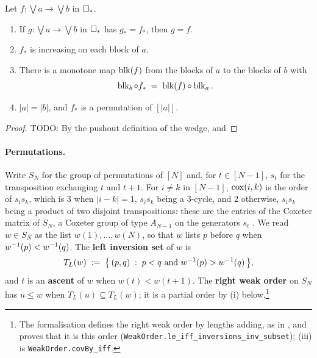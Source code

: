\documentclass[11pt]{article}
\begin{document}
\begin{proposition}\label{prop:coords}
  Let $f : \bigvee a \to \bigvee b$ in $\square_{*}$.
  \begin{enumerate}[label=(\roman*)]
    \item If $g : \bigvee a \to \bigvee b$ in $\square_{*}$ has $g_* = f_*$, then $g = f$.
    \item $f_*$ is increasing on each block of $a$.
    \item There is a monotone map $\operatorname{blk}(f)$ from the blocks of $a$ to the blocks of $b$ with
      \begin{equation}\label{eq:blk-coord}
        \operatorname{blk}_b \circ f_* \;=\; \operatorname{blk}(f) \circ \operatorname{blk}_a .
      \end{equation}
    \item $|a| = |b|$, and $f_*$ is a permutation of $[|a|]$.
  \end{enumerate}
\end{proposition}
\begin{proof}
  TODO: By the pushout definition of the wedge, and 
\end{proof}

\paragraph{Permutations.}
Write $S_N$ for the group of permutations of $[N]$ and, for $t \in [N-1]$, $s_t$ for the
transposition exchanging $t$ and $t+1$. For
$i \neq k$ in $[N-1]$, $\operatorname{cox}(i,k)$ is the order of $s_is_k$, which is $3$ when $|i-k| = 1$, $s_is_k$ being a
$3$-cycle, and $2$ otherwise, $s_is_k$ being a product of two disjoint transpositions: these are the entries of the Coxeter matrix of $S_N$, a Coxeter group of type $A_{N-1}$
on the generators $s_t$ \cite[\S1.1, Prop.~1.5.4]{BB}. We read $w \in S_N$ as the list
$w(1), \dots, w(N)$, so that $w$ lists $p$ before $q$ when $w^{-1}(p) < w^{-1}(q)$. The
\textbf{left inversion set} of $w$ is
\[
  T_L(w) \;:=\; \bigl\{\, (p,q) \;:\; p < q \text{ and } w^{-1}(p) > w^{-1}(q) \,\bigr\} ,
\]
and $t$ is an \textbf{ascent} of $w$ when $w(t) < w(t+1)$. The \textbf{right weak order} on $S_N$
has $u \le w$ when $T_L(u) \subseteq T_L(w)$; it is a partial order by (i)
below.\footnote{The formalisation defines the right weak order by lengths adding, as in
\cite[Prop.~3.1.2(ii)]{BB}, and proves that it is this order
(\texttt{WeakOrder.le\_iff\_inversions\_inv\_subset}); (iii) is
\texttt{WeakOrder.covBy\_iff}.}
\end{document}
